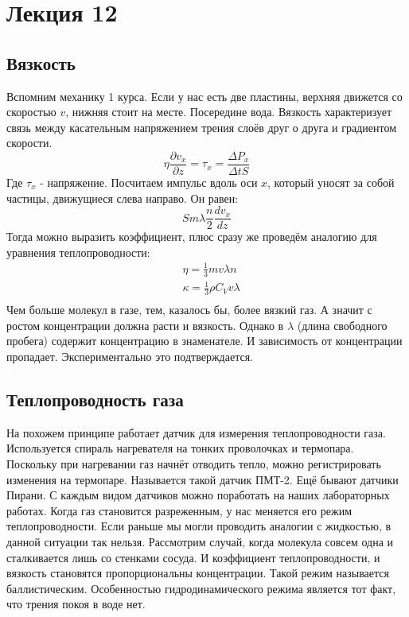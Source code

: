 \documentclass[a4paper, 12pt]{article}
\begin{document}
	\section{Лекция 12}
	\subsection{Вязкость}
	Вспомним механику 1 курса. Если у нас есть две пластины, верхняя движется со скоростью $v$, нижняя стоит на месте. Посередине вода. Вязкость характеризует связь между касательным напряжением трения слоёв друг о друга и градиентом скорости.
	\begin{equation*}
		\eta \frac{\partial v_{x}}{\partial z} = \tau_{x} = \frac{\Delta P_{x}}{\Delta t S}
	\end{equation*}
	Где $\tau_{x}$ - напряжение. Посчитаем импульс вдоль оси $x$, который уносят за собой частицы, движущиеся слева направо. Он равен:
	\begin{equation*}
		Sm\lambda \frac{n}{2} \frac{dv_{x}}{dz} 
	\end{equation*}
	Тогда можно выразить коэффициент, плюс сразу же проведём аналогию для уравнения теплопроводности:
	\begin{equation*}
		\begin{aligned}
			& \eta = \frac{1}{3} m v \lambda n         \\
			& \kappa =\frac{1}{3} \rho C_{V} v \lambda \\
		\end{aligned}
	\end{equation*}
	Чем больше молекул в газе, тем, казалось бы, более вязкий газ. А значит с ростом концентрации должна расти и вязкость. Однако в $\lambda$ (длина свободного пробега) содержит концентрацию в знаменателе. И зависимость от концентрации пропадает. Экспериментально это подтверждается. 
	
	\subsection{Теплопроводность газа}
	На похожем принципе работает датчик для измерения теплопроводности газа. Используется спираль нагревателя на тонких проволочках и термопара. Поскольку при нагревании газ начнёт отводить тепло, можно регистрировать изменения на термопаре. Называется такой датчик ПМТ-2. Ещё бывают датчики Пирани. С каждым видом датчиков можно поработать на наших лабораторных работах. Когда газ становится разреженным, у нас меняется его режим теплопроводности. Если раньше мы могли проводить аналогии с жидкостью, в данной ситуации так нельзя. Рассмотрим случай, когда молекула совсем одна и сталкивается лишь со стенками сосуда. И коэффициент теплопроводности, и вязкость становятся пропорциональны концентрации. Такой режим называется баллистическим. Особенностью гидродинамического режима является тот факт, что трения покоя в воде нет.
	
\end{document}
